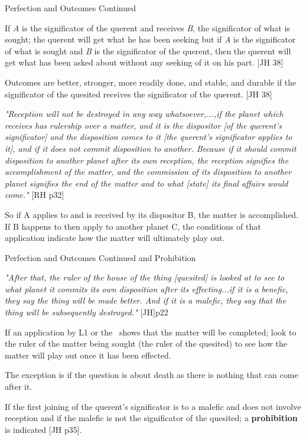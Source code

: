 \begin{frame}[t]{Perfection and Outcomes Continued}

If \textsl{A} is the significator of the querent and receives \textsl{B}, the significator of what is sought; the querent will get what he has been seeking but if \textsl{A} is the significator of what is sought and \textsl{B} is the significator of the querent, then the querent will get what has been asked about without any seeking of it on his part. [JH 38]

Outcomes are better, stronger, more readily done, and stable, and durable if the significator of the quesited receives the significator of the querent. [JH 38]

\begin{block}{}
\textsl{"Reception will not be destroyed in any way whatsoever,...,if the planet which receives has rulership over a matter, and it is the dispositor [of the querent's significator] and the disposition comes to it [the querent's significator applies to it], and if it does not commit disposition to another. Because if it should commit disposition to another planet after its own reception, the reception signifies the accomplishment of the matter, and the commission of its disposition to another planet signifies the end of the matter and to what [state] its final affairs would come."} [RH p32]
\end{block}
So if A applies to and is received by its dispositor B, the matter is accomplished. If B happens to then apply to another planet C, the conditions of that application indicate how the matter will ultimately play out.
\end{frame}
\begin{frame}[t]{Perfection and Outcomes Continued and Prohibition}

\begin{block}{}
\textsl{"After that, the ruler of the house of the thing [quesited] is looked at to see to what planet it commits its own disposition after its effecting...if it is a benefic, they say the thing will be made better. And if it is a malefic, they say that the thing will be subsequently destroyed."} [JH]p22
\end{block}
If an application by L1 or the \Moon\ shows that the matter will be completed; look to the ruler of the matter being sought (the ruler of the quesited) to see how the matter will play out once it has been effected.

The exception is if the question is about death as there is nothing that can come after it.

If the first joining of the querent's significator is to a malefic and does not involve reception and if the malefic is not the significator of the quesited;  a \textbf{prohibition} is indicated [JH p35].

\end{frame}